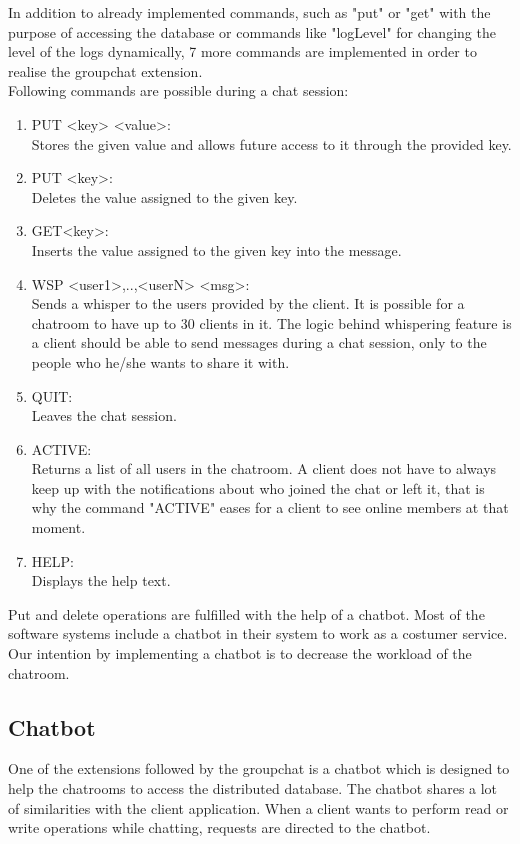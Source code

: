 In addition to already implemented commands, such as "put" or "get" with the purpose of accessing the database or commands like "logLevel" for changing the level of the logs dynamically, 7 more commands are implemented in order to realise the groupchat extension.\\
Following commands are possible during a chat session:
\begin{enumerate}
  \item 	PUT <key> <value>: \\
Stores the given value and allows future access to it through the provided key. 
  \item PUT <key>:\\
Deletes the value assigned to the given key.
  \item GET{<key>}:\\
Inserts the value assigned to the given key into the message.
  \item WSP <user1>,..,<userN> <msg>:\\
Sends a whisper to the users provided by the client. It is possible for a chatroom to have     up to 30 clients in it. The logic behind whispering feature is a client should be able to send messages during a chat session, only to the people who he/she wants to share it with.  
  \item QUIT:\\
  Leaves the chat session.
  \item ACTIVE:\\
   Returns a list of all users in the chatroom. A client does not have to always keep up with the notifications about who joined the chat or left it, that is why the command "ACTIVE" eases for a client to see online members at that moment.
  \item HELP:\\
  Displays the help text.
\end{enumerate}
Put and delete operations are fulfilled with the help of a chatbot. Most of the software systems include a chatbot in their system to work as a costumer service. Our intention by implementing a chatbot is to decrease the workload of the chatroom.

\subsection{Chatbot}
\label{sec:groupchat_chatbot}
One of the extensions followed by the groupchat is a chatbot which is designed to help the chatrooms to access the distributed database. The chatbot shares a lot of similarities with the client application. When a client wants to perform read or write operations while chatting, requests are directed to the chatbot.



